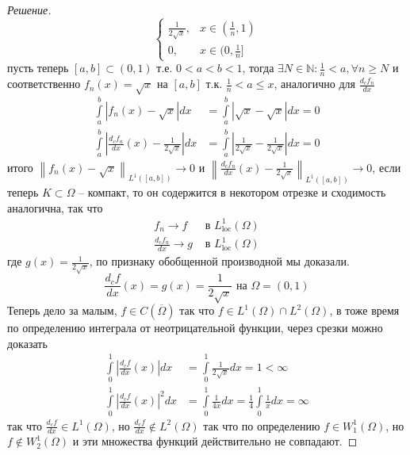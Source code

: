 \documentclass[12pt,a4paper]{article}
\theoremstyle{definition}
\newenvironment{solution}
{\renewcommand\qedsymbol{$\blacksquare$}\begin{proof}[Решение]}
{\end{proof}}
\newcommand{\Natural}{\mathbb{N}}
\newcommand{\norm}[1]{\left\lVert#1\right\rVert}
\begin{document}
\begin{solution}
\begin{equation*}
\begin{cases}
			\frac{1}{2\sqrt{x}}, &x\in (\frac{1}{n}, 1) \\
			0, &x \in (0, \frac{1}{n}]
		\end{cases}
	\end{equation*}
	пусть теперь $[a, b] \subset (0, 1)$ т.е. $0 < a < b < 1$, тогда $\exists N \in \Natural: \frac{1}{n} < a, \forall n \geq N$ и соответственно $f_n (x) = \sqrt{x}$ на $[a, b]$ т.к. $\frac{1}{n} < a \leq x$, аналогично для $\frac{d_c f_n}{dx}$
	\begin{align*}
		\int\limits_{a}^{b}{|f_n (x) - \sqrt{x}| dx} &= \int\limits_{a}^{b}{|\sqrt{x} - \sqrt{x}| dx} = 0 \\
		\int\limits_{a}^{b}{\left|\frac{d_c f_n}{dx} (x) - \frac{1}{2\sqrt{x}}\right| dx} &= \int\limits_{a}^{b}{\left|\frac{1}{2\sqrt{x}} - \frac{1}{2\sqrt{x}}\right| dx} = 0
	\end{align*}
	итого $\norm{f_n (x) - \sqrt{x}}_{L^1 ([a, b])} \to 0$ и $\norm{\frac{d_c f_n}{dx} (x) - \frac{1}{2\sqrt{x}}}_{L^1 ([a, b])} \to 0$, если теперь $K \subset \Omega$ -- компакт, то он содержится в некотором отрезке и сходимость аналогична, так что
	\begin{align*}
		f_n \to f &\text{ в } L_{\text{loc}}^1 (\Omega) \\
		\frac{d_c f_n}{dx} \to g &\text{ в } L_{\text{loc}}^1 (\Omega)
	\end{align*}
	где $g(x) = \frac{1}{2\sqrt{x}}$, по признаку обобщенной производной мы доказали. 
	\begin{equation*}
		\frac{d_c f}{dx} (x) = g(x) = \frac{1}{2\sqrt{x}} \text{ на } \Omega = (0, 1)
	\end{equation*}
	Теперь дело за малым, $f \in C(\overline{\Omega})$ так что $f \in L^1 (\Omega) \cap L^2 (\Omega)$, в тоже время по определению интеграла от неотрицательной функции, через срезки можно доказать
	\begin{align*}
		\int\limits_{0}^{1}{\left|\frac{d_c f}{dx} (x)\right| dx} &= \int\limits_{0}^{1}{\frac{1}{2\sqrt{x}} dx} = 1 < \infty \\
		\int\limits_{0}^{1}{\left|\frac{d_c f}{dx} (x)\right|^2 dx} &= \int\limits_{0}^{1}{\frac{1}{4x} dx} = \frac{1}{4}\int\limits_{0}^{1}{\frac{1}{x} dx} = \infty
	\end{align*}
	так что $\frac{d_c f}{dx} \in L^1 (\Omega)$, но $\frac{d_c f}{dx} \notin L^2 (\Omega)$ так что по определению $f \in W_1^1 (\Omega)$, но $f \notin W_2^1 (\Omega)$ и эти множества функций действительно не совпадают.
\end{solution}
\newpage
\end{document}
